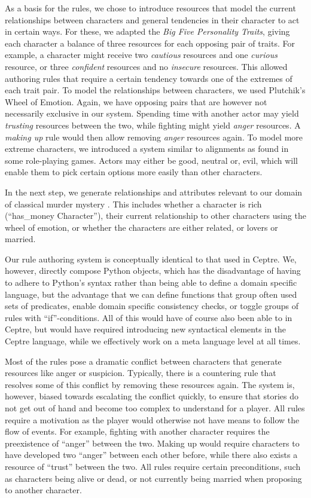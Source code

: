 As a basis for the rules, we chose to introduce resources that model the current relationships between characters and general tendencies in their character to act in certain ways. For these, we adapted the \emph{Big Five Personality Traits},  giving each character a balance of three resources for each opposing pair of traits. For example, a character might receive two \emph{cautious} resources and one \emph{curious} resource, or three \emph{confident} resources and no \emph{insecure} resources. This allowed authoring rules that require a certain tendency towards one of the extremes of each trait pair. To model the relationships between characters, we used Plutchik's Wheel of Emotion. Again, we have opposing pairs that are however not necessarily exclusive in our system. Spending time with another actor may yield \emph{trusting} resources between the two, while fighting might yield \emph{anger} resources. A \emph{making up} rule would then allow removing \emph{anger} resources again. To model more extreme characters, we introduced a system similar to alignments as found in some role-playing games. Actors may either be good, neutral or, evil, which will enable them to pick certain options more easily than other characters.

In the next step, we generate relationships and attributes relevant to our domain of classical murder mystery . This includes whether a character is rich (\enquote{has\_money Character}), their current relationship to other characters using the wheel of emotion, or whether the characters are either related, or lovers or married.

Our rule authoring system is conceptually identical to that used in Ceptre. We, however, directly compose Python objects, which has the disadvantage of having to adhere to Python's syntax rather than being able to define a domain specific language, but the advantage that we can define functions that group often used sets of predicates, enable domain specific consistency checks, or toggle groups of rules with \enquote{if}-conditions. All of this would have of course also been able to in Ceptre, but would have required introducing new syntactical elements in the Ceptre language, while we effectively work on a meta language level at all times.

Most of the rules pose a dramatic conflict between characters that generate resources like anger or suspicion.
Typically, there is a countering rule that resolves some of this conflict by removing these resources again.
The system is, however, biased towards escalating the conflict quickly, to ensure that stories do not get out of hand and become too complex to understand for a player. All rules require a motivation as the player would otherwise not have means to follow the flow of events. For example, fighting with another character requires the preexistence of \enquote{anger} between the two. Making up would require characters to have developed two \enquote{anger} between each other before, while there also exists a resource of \enquote{trust} between the two. All rules require certain preconditions, such as characters being alive or dead, or not currently being married when proposing to another character.


